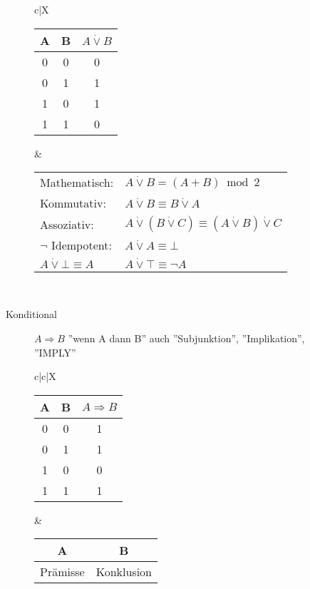 \begin{description}
\begin{description}
        \begin{tabularx}{\linewidth}{c|X}
            \begin{tabular}[t]{c|c||c}
                A & B & $A \dot{\vee} B$ \\ \hline\hline
                0 & 0 & 0                \\ \hline
                0 & 1 & 1                \\ \hline
                1 & 0 & 1                \\ \hline
                1 & 1 & 0
            \end{tabular} &
            \begin{tabular}[t]{ll}
                Mathematisch:                & $A \dot{\vee} B = (A + B)\bmod 2$                                    \\
                Kommutativ:                  & $A \dot{\vee} B \equiv B \dot{\vee} A$                               \\
                Assoziativ:                  & $A \dot{\vee} (B \dot{\vee} C) \equiv (A \dot{\vee} B) \dot{\vee} C$ \\
                $\neg$ Idempotent:           & $A \dot{\vee} A \equiv \bot$                                         \\
                $A \dot{\vee} \bot \equiv A$ & $A \dot{\vee} \top \equiv \neg A$
            \end{tabular} \\ \hline
        \end{tabularx}
        \item[Konditional] $A\Rightarrow B$ ''wenn A dann B'' auch ''Subjunktion'', ''Implikation'', ''IMPLY'' \\
        \begin{tabularx}{\linewidth}{c|c|X}
            \begin{tabular}[t]{c|c||c}
                A & B & $A \Rightarrow B$ \\ \hline\hline
                0 & 0 & 1                 \\ \hline
                0 & 1 & 1                 \\ \hline
                1 & 0 & 0                 \\ \hline
                1 & 1 & 1
            \end{tabular} &
            \begin{tabular}[t]{c|c}
                A             & B          \\ \hline
                Prämisse      & Konklusion \\

\end{tabular}
\end{tabularx}
\end{description}
\end{description}
